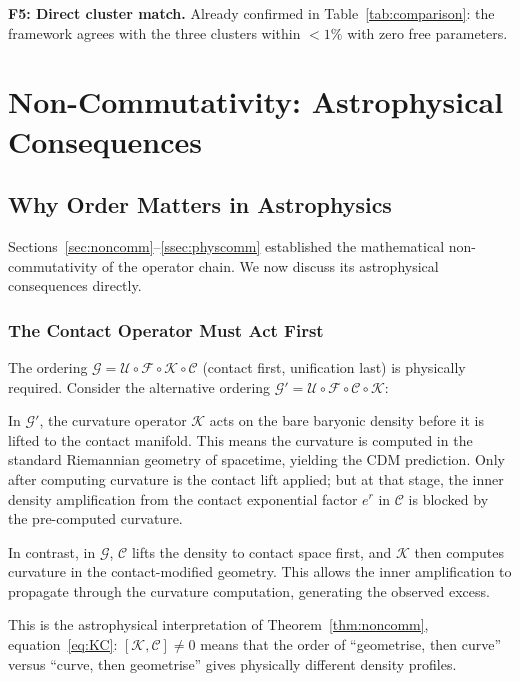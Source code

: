 \documentclass[11pt,a4paper,openright]{book}
\theoremstyle{dm3thm}
\theoremstyle{dm3def}
\newcommand{\GG}{\mathcal{G}}
\newcommand{\UU}{\mathcal{U}}
\newcommand{\FF}{\mathcal{F}}
\newcommand{\KK}{\mathcal{K}}
\newcommand{\CC}{\mathcal{C}}
\begin{document}
\medskip
\noindent\textbf{F5: Direct cluster match.}
Already confirmed in Table~\ref{tab:comparison}: the framework agrees with
the three \citet{NatarajanChiangDutra2026} clusters within $<1\%$ with zero
free parameters.

\chapter{Non-Commutativity: Astrophysical Consequences}
\label{ch:noncomm2}

\section{Why Order Matters in Astrophysics}

Sections~\ref{sec:noncomm}--\ref{ssec:physcomm} established the mathematical
non-commutativity of the operator chain.  We now discuss its astrophysical
consequences directly.

\subsection{The Contact Operator Must Act First}

The ordering $\GG = \UU\circ\FF\circ\KK\circ\CC$ (contact first, unification
last) is physically required.  Consider the alternative ordering
$\GG' = \UU\circ\FF\circ\CC\circ\KK$:

In $\GG'$, the curvature operator $\KK$ acts on the bare baryonic density
before it is lifted to the contact manifold.  This means the curvature
is computed in the standard Riemannian geometry of spacetime, yielding the
CDM prediction.  Only after computing curvature is the contact lift applied;
but at that stage, the inner density amplification from the contact
exponential factor $e^r$ in $\CC$ is blocked by the pre-computed curvature.

In contrast, in $\GG$, $\CC$ lifts the density to contact space first, and
$\KK$ then computes curvature in the contact-modified geometry.  This allows
the inner amplification to propagate through the curvature computation,
generating the observed excess.

This is the astrophysical interpretation of Theorem~\ref{thm:noncomm},
equation~\eqref{eq:KC}: $[\KK,\CC]\neq 0$ means that the order of
``geometrise, then curve'' versus ``curve, then geometrise'' gives physically
different density profiles.
\end{document}
